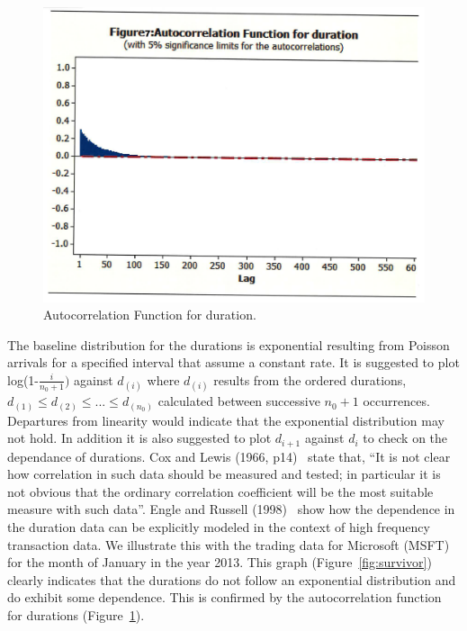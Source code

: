 	\begin{figure}[!ht]
	\centering
	 \includegraphics[width=\textwidth]{chapters/chapter_uvts/figures/Sec2-10Fig7.png}
	\caption{Autocorrelation Function for duration. \label{fig:duration}}
	\end{figure}
 
 The baseline distribution for the durations is exponential resulting from Poisson arrivals for a specified interval that assume a constant rate. It is suggested to plot log(1-$\frac{i}{n_0+1})$ against $d_{(i)}$ where $d_{(i)}$ results from the ordered durations, $d_{(1)} \leq d_{(2)} \leq ... \leq d_{(n_0)}$ calculated between successive $n_0+1$ occurrences. Departures from linearity would indicate that the exponential distribution may not hold. In addition it is also suggested to plot $d_{i+1}$ against $d_i$ to check on the dependance of durations. Cox and Lewis (1966, p14)~\cite{cox1966} state that, ``It is not clear how correlation in such data should be measured and tested; in particular it is not obvious that the ordinary correlation coefficient will be the most suitable measure with such data''. Engle and Russell (1998)~\cite{engle1998} show how the dependence in the duration data can be explicitly modeled in the context of high frequency transaction data. We illustrate this with the trading data for Microsoft (MSFT) for the month of January in the year 2013. This graph (Figure~\ref{fig:survivor}) clearly indicates that the durations do not follow an exponential distribution and do exhibit some dependence. This is confirmed by the autocorrelation function for durations (Figure~\ref{fig:duration}).


